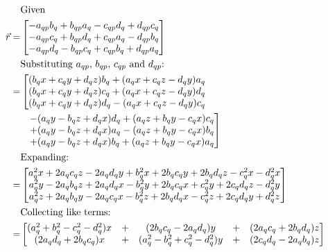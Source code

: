 \documentclass[12pt, a4paper]{article}
\begin{document}
\begin{align*}
    &\text{Given} \\
    \vec{r} = &\begin{bmatrix}
        - a_{qp}b_q + b_{qp}a_q - c_{qp}d_q + d_{qp}c_q \\
        - a_{qp}c_q + b_{qp}d_q + c_{qp}a_q - d_{qp}b_q \\
        - a_{qp}d_q - b_{qp}c_q + c_{qp}b_q + d_{qp}a_q
    \end{bmatrix} \\
    &\text{Substituting $a_{qp}$, $b_{qp}$, $c_{qp}$ and $d_{qp}$:} \\
    =&\left[\begin{matrix}
        (b_qx + c_qy + d_qz)b_q + (a_qx + c_qz - d_qy)a_q \\
        (b_qx + c_qy + d_qz)c_q + (a_qx + c_qz - d_qy)d_q \\
        (b_qx + c_qy + d_qz)d_q - (a_qx + c_qz - d_qy)c_q
    \end{matrix}\right.\\
    &\hspace{0.24cm}
    \left.\begin{matrix}
        - (a_qy - b_qz + d_qx)d_q + (a_qz + b_qy - c_qx )c_q \\
        + (a_qy - b_qz + d_qx)a_q - (a_qz + b_qy - c_qx )b_q \\
        + (a_qy - b_qz + d_qx)b_q + (a_qz + b_qy - c_qx )a_q
    \end{matrix}\right] \\
    &\text{Expanding:} \\
    = &\begin{bmatrix}
        a_q^2 x + 2 a_q c_q z - 2 a_q d_q y + b_q^2 x + 2 b_q c_q y + 2 b_q d_q z - c_q^2 x - d_q^2 x \\
        a_q^2 y - 2 a_q b_q z + 2 a_q d_q x - b_q^2 y + 2 b_q c_q x + c_q^2 y + 2 c_q d_q z - d_q^2 y \\
        a_q^2 z + 2 a_q b_q y - 2 a_q c_q x - b_q^2 z + 2 b_q d_q x - c_q^2 z + 2 c_q d_q y + d_q^2 z
    \end{bmatrix} \\
    &\text{Collecting like terms:} \\
    = &\begin{bmatrix}
        (a_q^2 + b_q^2 - c_q^2 - d_q^2)x &+& (2 b_q c_q - 2 a_q d_q)y &+& (2 a_q c_q + 2 b_q d_q)z \\
        (2 a_q d_q + 2 b_q c_q)x &+& (a_q^2 - b_q^2 + c_q^2 - d_q^2)y &+& (2 c_q d_q - 2 a_q b_q) z \\

\end{bmatrix}
\end{align*}
\end{document}

